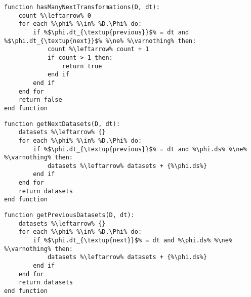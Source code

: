 \begin{minipage}[c]{0.95\textwidth} \begin{lstlisting}[language=pseudocode,label={lst:has-many-next-transformations},caption={[Contagem das próximas transformações de dados de uma transformação]Contagem das próximas transformações de dados de uma transformação de dados. Retorna verdadeiro caso essa quantidade seja maior do que 1, e falso caso contrário.}]
function hasManyNextTransformations(D, dt):
    count %\leftarrow% 0
    for each %\phi% %\in% %D.\Phi% do:
        if %$\phi.dt_{\textup{previous}}$% = dt and %$\phi.dt_{\textup{next}}$% %\ne% %\varnothing% then:
            count %\leftarrow% count + 1
            if count > 1 then:
                return true
            end if
        end if
    end for
    return false
end function
\end{lstlisting}
\end{minipage}

\vfill{}

\begin{minipage}[c]{0.95\textwidth}
\begin{lstlisting}[language=pseudocode,label={lst:get-next-datasets},caption={[Obtenção dos próximos conjuntos de dados de uma transformação]Obtenção dos próximos conjuntos de dados de uma transformação de dados.}]
function getNextDatasets(D, dt):
    datasets %\leftarrow% {}
    for each %\phi% %\in% %D.\Phi% do:
        if %$\phi.dt_{\textup{previous}}$% = dt and %\phi.ds% %\ne% %\varnothing% then:
            datasets %\leftarrow% datasets + {%\phi.ds%}
        end if
    end for
    return datasets
end function
\end{lstlisting}
\end{minipage}

\vfill{}

\begin{minipage}[c]{0.95\textwidth}
\begin{lstlisting}[language=pseudocode,label={lst:get-previous-datasets},caption={[Obtenção dos conjuntos de dados anteriores a uma transformação]Obtenção dos conjuntos de dados anteriores a uma transformação de dados.}]
function getPreviousDatasets(D, dt):
    datasets %\leftarrow% {}
    for each %\phi% %\in% %D.\Phi% do:
        if %$\phi.dt_{\textup{next}}$% = dt and %\phi.ds% %\ne% %\varnothing% then:
            datasets %\leftarrow% datasets + {%\phi.ds%}
        end if
    end for
    return datasets
end function
\end{lstlisting}
\end{minipage}